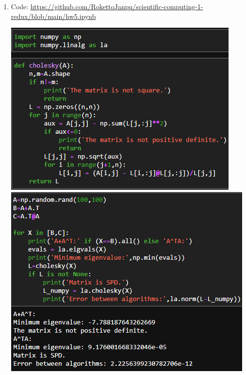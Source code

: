 \documentclass{article}
\begin{document}
\begin{enumerate}
	\pagebreak
	
	
	
	\item Code: \url{https://github.com/RokettoJanpu/scientific-computing-1-redux/blob/main/hw5.ipynb}
	
	\begin{center}
		\includegraphics[scale=.8]{hw5 p1}
		\includegraphics[scale=.7]{hw5 p2}
	\end{center}
	
	
	
\end{enumerate}
	
	
\end{document}
